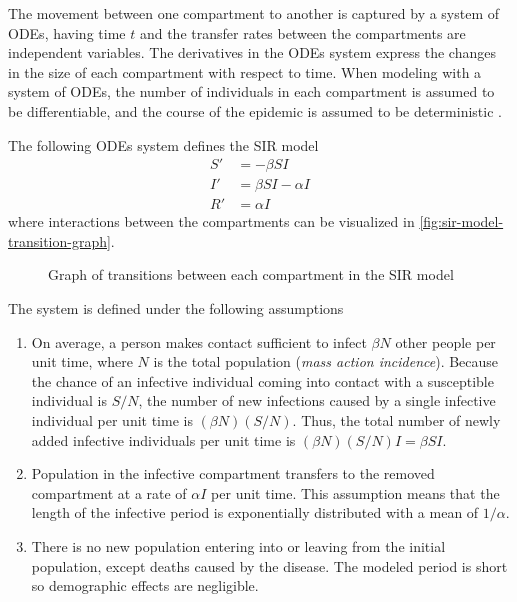 The movement between one compartment to another is captured by a system of \glspl{ODE}, having time $t$ and the transfer rates between the compartments are independent variables.
The derivatives in the \glspl{ODE} system express the changes in the size of each compartment with respect to time.
When modeling with a system of \glspl{ODE}, the number of individuals in each compartment is assumed to be differentiable, and the course of the epidemic is assumed to be deterministic \cite{brauerCompartmentalModelsEpidemiology2008}.

The following \glspl{ODE} system defines the \gls{SIR} model \cite{brauerCompartmentalModelsEpidemiology2008, kermackContributionMathematicalTheory1927}
\begin{align*}
    S' &= - \beta S I \\
    I' &= \beta S I - \alpha I \\
    R' &= \alpha I
\end{align*}
where interactions between the compartments can be visualized in \autoref{fig:sir-model-transition-graph}.
\begin{figure}
    \centering
    \caption{Graph of transitions between each compartment in the SIR model}
    \label{fig:sir-model-transition-graph}
\end{figure}
The system is defined under the following assumptions \cite{brauerCompartmentalModelsEpidemiology2008, kermackContributionMathematicalTheory1927}
\begin{enumerate}
    \item On average, a person makes contact sufficient to infect $\beta N$ other people per unit time, where $N$ is the total population (\textit{mass action incidence}).
    Because the chance of an infective individual coming into contact with a susceptible individual is $S / N$, the number of new infections caused by a single infective individual per unit time is $(\beta N) (S / N)$.
    Thus, the total number of newly added infective individuals per unit time is $(\beta N) (S / N) I = \beta S I$.
    \label{assumption:basic-sir-contact-rate}

    \item Population in the infective compartment transfers to the removed compartment at a rate of $\alpha I$ per unit time.
    This assumption means that the length of the infective period is exponentially distributed with a mean of $1 / \alpha$.
    \label{assumption:basic-sir-infective-period}

    \item There is no new population entering into or leaving from the initial population, except deaths caused by the disease.
    The modeled period is short so demographic effects are negligible.
    \label{assumption:basic-sir-constant-population}
\end{enumerate}

